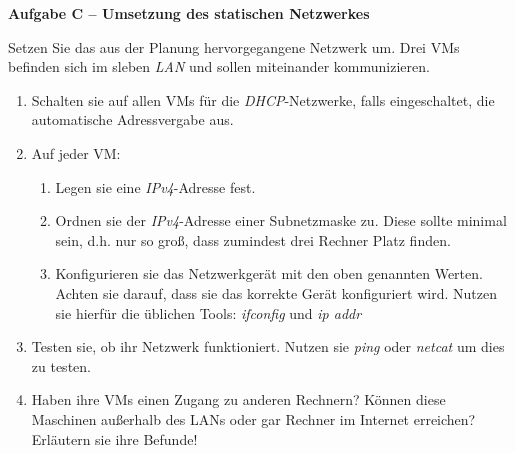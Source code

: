 \documentclass[paper=a4,fontsize=11pt]{scrartcl}%
\begin{document}
\begin{center}\Large{\textbf{Aufgabe C -- Umsetzung des statischen Netzwerkes}}\end{center}\vskip0.25in
Setzen Sie das aus der Planung hervorgegangene Netzwerk um. Drei VMs befinden sich im sleben \emph{LAN} und sollen miteinander kommunizieren.
\begin{enumerate}
	\item Schalten sie auf allen VMs für die \emph{DHCP}-Netzwerke, falls eingeschaltet, die automatische Adressvergabe aus.
	\item Auf jeder VM:
	\begin{enumerate}
		\item Legen sie eine \emph{IPv4}-Adresse fest.
		\item Ordnen sie der  \emph{IPv4}-Adresse einer Subnetzmaske zu. Diese sollte minimal sein, d.h. nur so groß, dass zumindest drei Rechner Platz finden.
		\item Konfigurieren sie das Netzwerkgerät mit den oben genannten Werten. Achten sie darauf, dass sie das korrekte Gerät konfiguriert wird. Nutzen sie hierfür die üblichen Tools: \emph{ifconfig} und \emph{ip addr}
	\end{enumerate}
	\item Testen sie, ob ihr Netzwerk funktioniert. Nutzen sie \emph{ping} oder \emph{netcat} um dies zu testen.
	\item Haben ihre VMs einen Zugang zu anderen Rechnern? Können diese Maschinen außerhalb des LANs oder gar Rechner im Internet erreichen? Erläutern sie ihre Befunde!
\end{enumerate}
\end{document}
